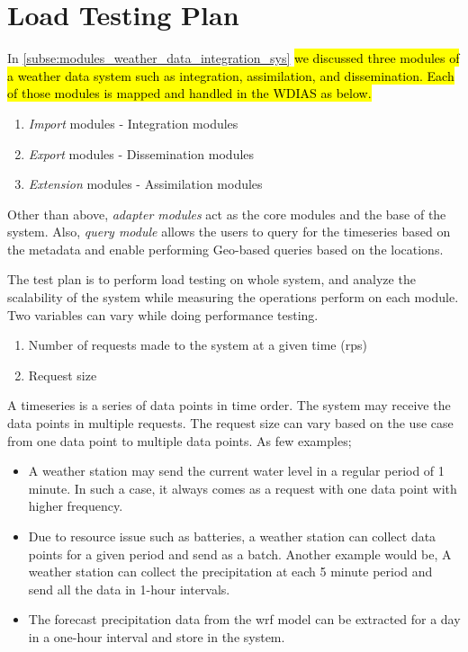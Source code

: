 \section{Load Testing Plan}
\label{se:test_plan}

In \cref{subse:modules_weather_data_integration_sys} \hl{we discussed three modules of a weather data system such as integration, assimilation, and dissemination. Each of those modules is mapped and handled in the WDIAS as below.}
\begin{enumerate}
    \item \emph{Import} modules - Integration modules
    \item \emph{Export} modules - Dissemination modules
    \item \emph{Extension} modules - Assimilation modules
\end{enumerate}
Other than above, \emph{adapter modules} act as the core modules and the base of the system. Also, \emph{query module} allows the users to query for the timeseries based on the metadata and enable performing Geo-based queries based on the locations.

The test plan is to perform load testing on whole system, and analyze the scalability of the system while measuring the operations perform on each module. Two variables can vary while doing performance testing.
\begin{enumerate}
    \item Number of requests made to the system at a given time (\acrfull{rps})
    \item Request size
\end{enumerate}
A timeseries is a series of data points in time order. The system may receive the data points in multiple requests.
The request size can vary based on the use case from one data point to multiple data points. As few examples;
\begin{itemize}
    \item A weather station may send the current water level in a regular period of 1 minute. In such a case, it always comes as a request with one data point with higher frequency.
    \item Due to resource issue such as batteries, a weather station can collect data points for a given period and send as a batch. Another example would be,
A weather station can collect the precipitation at each 5 minute period and send all the data in 1-hour intervals.
    \item The forecast precipitation data from the \acrshort{wrf} model can be extracted for a day in a one-hour interval and store in the system.
\end{itemize}


